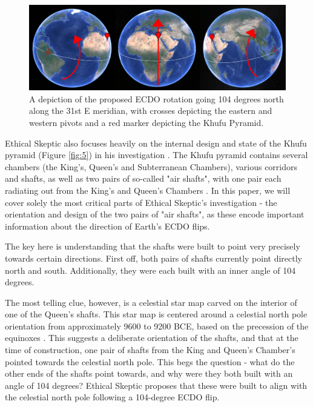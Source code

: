 \documentclass[10pt,twocolumn,letterpaper]{article}
\begin{document}
\begin{figure}[b]
\begin{center}
\includegraphics[width=1\textwidth]{drawing.jpg}
\end{center}
   \caption{A depiction of the proposed ECDO rotation going 104 degrees north along the 31st E meridian, with crosses depicting the eastern and western pivots and a red marker depicting the Khufu Pyramid.}
\label{fig:6}
\end{figure}

Ethical Skeptic also focuses heavily on the internal design and state of the Khufu pyramid (Figure \ref{fig:5}) in his investigation \cite{28}. The Khufu pyramid contains several chambers (the King's, Queen's and Subterranean Chambers), various corridors and shafts, as well as two pairs of so-called "air shafts", with one pair each radiating out from the King's and Queen's Chambers \cite{29,30}. In this paper, we will cover solely the most critical parts of Ethical Skeptic's investigation - the orientation and design of the two pairs of "air shafts", as these encode important information about the direction of Earth's ECDO flips.


The key here is understanding that the shafts were built to point very precisely towards certain directions. First off, both pairs of shafts currently point directly north and south. Additionally, they were each built with an inner angle of 104 degrees.

The most telling clue, however, is a celestial star map carved on the interior of one of the Queen's shafts. This star map is centered around a celestial north pole orientation from approximately 9600 to 9200 BCE, based on the precession of the equinoxes \cite{28}. This suggests a deliberate orientation of the shafts, and that at the time of construction, one pair of shafts from the King and Queen's Chamber's pointed towards the celestial north pole. This begs the question - what do the other ends of the shafts point towards, and why were they both built with an angle of 104 degrees? Ethical Skeptic proposes that these were built to align with the celestial north pole following a 104-degree ECDO flip.
\end{document}
